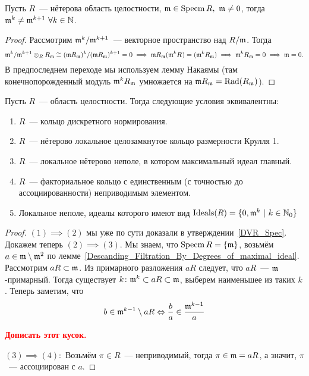 	\begin{lemma}\label{Descanding_Filtration_By_Degrees_of_maximal_ideal} 
		Пусть $R$~--- нётерова область целостности, $\mathfrak{m} \in \operatorname{Specm}{R}, \ \mathfrak{m} \neq 0$, тогда $\mathfrak{m}^k \neq \mathfrak{m}^{k + 1} \ \forall k \in \mathbb{N}$.
	\end{lemma}
	\begin{proof}
		Рассмотрим $\mathfrak{m}^{k}/\mathfrak{m}^{k + 1}$~--- векторное пространство над $R/\mathfrak{m}$. Тогда 
		\[
			\mathfrak{m}^{k}/\mathfrak{m}^{k + 1} \otimes_{R} R_{\mathfrak{m}} \cong (\mathfrak{m} R_{\mathfrak{m}})^{k} / (\mathfrak{m} R_{\mathfrak{m}})^{k + 1} = 0 \implies \mathfrak{m} R_{\mathfrak{m}} (\mathfrak{m}^{k}R_{\rm}) = (\mathfrak{m}^{k}R_{\mathfrak{m}}) \implies \mathfrak{m}^k R_{\mathfrak{m}} = 0 \implies \mathfrak{m} = 0.
		\]
		В предпоследнем переходе мы используем лемму Накаямы (там конечнопорожденный модуль $\mathfrak{m}^{k} R_{\mathfrak{m}}$ умножается на $\mathfrak{m} R_{\mathfrak{m}} = \operatorname{Rad}(R_{\mathfrak{m}})$).
	\end{proof}

	\begin{theorem}\label{DVR_equiv} 
		Пусть $R$~--- область целостности. Тогда следующие условия эквивалентны: 
		\begin{enumerate}
			\item $R$~--- кольцо дискретного нормирования. 
			\item $R$~--- нётерово локальное целозамкнутое кольцо размерности Крулля 1. 
			\item $R$~--- локальное нётерово неполе, в котором максимальный идеал главный. 
			\item $R$~--- факториальное кольцо с единственным (с точностью до ассоциированности) неприводимым элементом. 
			\item Локальное неполе, идеалы которого имеют вид $\operatorname{Ideals}(R) = \{ 0, \mathfrak{m}^k \ \vert \ k \in \mathbb{N}_{0}\}$
		\end{enumerate}
	\end{theorem}
	\begin{proof}
		$(1) \implies (2)$ мы уже по сути доказали в утверждении~\ref{DVR_Spec}. Докажем теперь $(2) \implies (3)$. Мы знаем, что $\operatorname{Specm}{R} = \{ \mathfrak{m} \}$, возьмём $a \in \mathfrak{m} \setminus \mathfrak{m}^2$  по лемме~\ref{Descanding_Filtration_By_Degrees_of_maximal_ideal}. Рассмотрим $aR \subset \mathfrak{m}$. Из примарного разложения $aR$ следует, что $aR$~--- $\mathfrak{m}$-примарный. Тогда существует $k\colon \mathfrak{m}^{k} \subset aR \subset \mathfrak{m}$, выберем наименьшее из таких $k$. Теперь заметим, что 
		\[
			b \in \mathfrak{m}^{k - 1} \setminus aR \Leftrightarrow \frac{b}{a} \in \frac{\mathfrak{m}^{k - 1}}{a}
		\]

		\bf{\textcolor{red}{Дописать этот кусок.}}

		$(3) \implies (4):$ Возьмём $\pi \in R$~--- неприводимый, тогда $\pi \in \mathfrak{m} = aR$,  а значит, $\pi$~--- ассоциирован с $a$.

	\end{proof}



	
